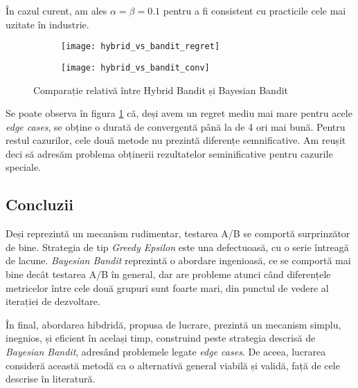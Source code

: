 În cazul curent, am ales $\alpha = \beta = 0.1$ pentru a fi consistent cu practicile cele mai uzitate în industrie.

\begin{figure}[H]
	\centering
	\begin{subfigure}{.5\textwidth}
		\centering
		\texttt{[image: hybrid\_vs\_bandit\_regret]}
	\end{subfigure}%
	\begin{subfigure}{.5\textwidth}
		\centering
		\texttt{[image: hybrid\_vs\_bandit\_conv]}
	\end{subfigure}
	\caption{Comparație relativă între Hybrid Bandit și Bayesian Bandit}
	\label{fig:hybrid_vs_bayesian}
\end{figure}

Se poate observa în figura \ref{fig:hybrid_vs_bayesian} că, deși avem un regret mediu mai mare pentru acele \textit{edge cases}, se obține o durată de convergentă până la de 4 ori mai bună. Pentru restul cazurilor, cele două metode nu prezintă diferențe semnificative. Am reușit deci să adresăm problema obținerii rezultatelor seminificative pentru cazurile speciale.

\subsection{Concluzii}

Deși reprezintă un mecanism rudimentar, testarea A/B se comportă surprinzător de bine. Strategia de tip \textit{Greedy Epsilon} este una defectuoasă, cu o serie întreagă de lacune. \textit{Bayesian Bandit} reprezintă o abordare ingenioasă, ce se comportă mai bine decât testarea A/B în general, dar are probleme atunci când diferențele metricelor între cele două grupuri sunt foarte mari, din punctul de vedere al iterației de dezvoltare. 

În final, abordarea hibdridă, propusa de lucrare, prezintă un mecanism simplu, inegnios, și eficient în același timp, construind peste strategia descrisă de \textit{Bayesian Bandit}, adresând problemele legate \textit{edge cases}. De aceea, lucrarea consideră această metodă ca o alternativă general viabilă și validă, față de cele descrise în literatură.


